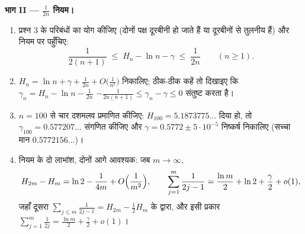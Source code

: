 \begin{problem}[{सप्ताहांत समस्या --- $H_n = \ln n + \gamma +
\frac{1}{2n} + O(n^{-2})$, और $1 - \frac12 +
\frac13 - \dots$ को पुनर्क्रमित करके $\frac{\ln 2}{2}$}]
\medskip \noindent\textbf{भाग II --- $\frac{1}{2n}$ नियम।}
\begin{enumerate}[resume]
  \item प्रश्न 3 के परिबंधों का योग कीजिए (दोनों पक्ष दूरबीनी हो जाते हैं या
  दूरबीनों से तुलनीय हैं) और नियम पर पहुँचिए:
        \[
        \frac{1}{2(n+1)} \;\leq\; H_n - \ln n - \gamma \;\leq\;
        \frac{1}{2n} \qquad (n \geq 1).
        \]
  \item $H_n = \ln n + \gamma + \frac{1}{2n} + O\bigl(\frac{1}{n^2}\bigr)$
  निकालिए; ठीक-ठीक कहें तो दिखाइए कि $\gamma_n = H_n - \ln n - \frac{1}{2n}$
  $-\frac{1}{2n(n+1)} \leq \gamma_n - \gamma \leq 0$ संतुष्ट करता है।
  \item $n = 100$ से चार दशमलव प्रमाणित कीजिए: $H_{100} = 5.1873775\dots$
  दिया हो, तो $\gamma_{100} = 0.577207\dots$ संगणित कीजिए और $\gamma =
  0.5772 \pm 5\cdot10^{-5}$ निष्कर्ष निकालिए (सच्चा मान $0.5772156\dots$)।
  \item नियम के दो लाभांश, दोनों आगे आवश्यक: जब $m \to \infty$,
        \[
        H_{2m} - H_m = \ln 2 - \frac{1}{4m} +
        O\Bigl(\frac{1}{m^2}\Bigr),
        \qquad
        \sum_{j=1}^{m} \frac{1}{2j-1} = \frac{\ln m}{2} + \ln 2
        + \frac\gamma2 + o(1) ,
        \]
        जहाँ दूसरा $\sum_{j \leq m} \frac{1}{2j-1} = H_{2m} - \frac12 H_m$
        के द्वारा, और इसी प्रकार $\sum_{j=1}^{m} \frac{1}{2j} = \frac{\ln
        m}{2} + \frac\gamma2 + o(1)$।
\end{enumerate}


\end{problem}
